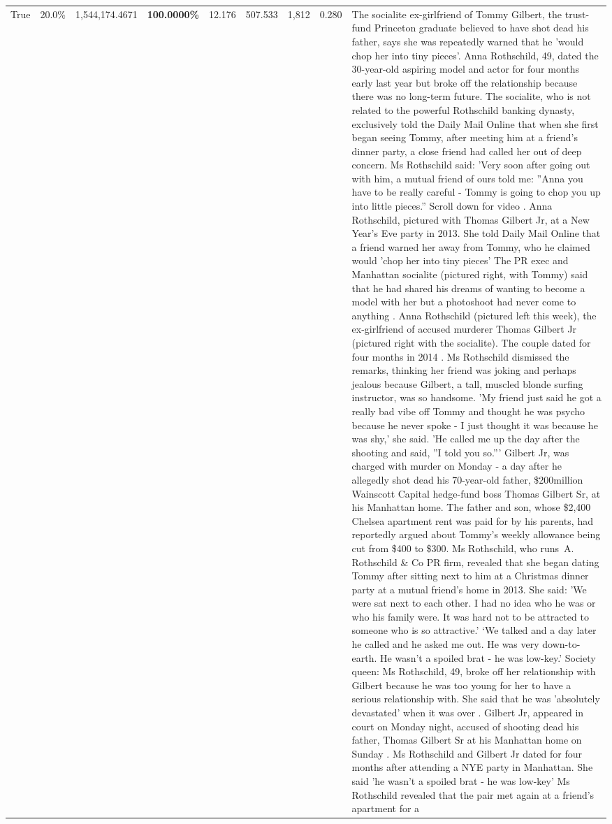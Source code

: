 \begin{table}[H]
\begin{tabular}{lllrlllll}
True & 20.0\% & 1,544,174.4671 & \bfseries \color{red} 100.0000\% & 12.176 & 507.533 & 1,812 & 0.280 & The socialite ex-girlfriend of Tommy Gilbert, the trust-fund Princeton graduate believed to have shot dead his father, says she was repeatedly warned that he 'would chop her into tiny pieces'. Anna Rothschild, 49, dated the 30-year-old aspiring model and actor for four months early last year but broke off the relationship because there was no long-term future. The socialite, who is not related to the powerful Rothschild banking dynasty, exclusively told the Daily Mail Online that when she first began seeing Tommy, after meeting him at a friend's dinner party, a close friend had called her out of deep concern. Ms Rothschild said: 'Very soon after going out with him, a mutual friend of ours told me: ''Anna you have to be really careful - Tommy is going to chop you up into little pieces.'' Scroll down for video . Anna Rothschild, pictured with Thomas Gilbert Jr, at a New Year's Eve party in 2013. She told Daily Mail Online that a friend warned her away from Tommy, who he claimed would 'chop her into tiny pieces' The PR exec and Manhattan socialite (pictured right, with Tommy) said that he had shared his dreams of wanting to become a model with her but a photoshoot had never come to anything . Anna Rothschild (pictured left this week), the ex-girlfriend of accused murderer Thomas Gilbert Jr (pictured right with the socialite). The couple dated for four months in 2014 . Ms Rothschild dismissed the remarks, thinking her friend was joking and perhaps jealous because Gilbert, a tall, muscled blonde surfing instructor, was so handsome. 'My friend just said he got a really bad vibe off Tommy and thought he was psycho because he never spoke - I just thought it was because he was shy,' she said. 'He called me up the day after the shooting and said, ''I told you so.''' Gilbert Jr, was charged with murder on Monday - a day after he allegedly shot dead his 70-year-old father, \$200million Wainscott Capital hedge-fund boss Thomas Gilbert Sr, at his Manhattan home. The father and son, whose \$2,400 Chelsea apartment rent was paid for by his parents, had reportedly argued about Tommy's weekly allowance being cut from \$400 to \$300. Ms Rothschild, who runs A. Rothschild \& Co PR firm, revealed that she began dating Tommy after sitting next to him at a Christmas dinner party at a mutual friend's home in 2013. She said: 'We were sat next to each other. I had no idea who he was or who his family were. It was hard not to be attracted to someone who is so attractive.' ‘We talked and a day later he called and he asked me out. He was very down-to-earth. He wasn’t a spoiled brat - he was low-key.’ Society queen: Ms Rothschild, 49, broke off her relationship with Gilbert because he was too young for her to have a serious relationship with. She said that he was 'absolutely devastated' when it was over . Gilbert Jr, appeared in court on Monday night, accused of shooting dead his father, Thomas Gilbert Sr at his Manhattan home on Sunday . Ms Rothschild and Gilbert Jr dated for four months after attending a NYE party in Manhattan. She said 'he wasn't a spoiled brat - he was low-key' Ms Rothschild revealed that the pair met again at a friend’s apartment for a 
\end{tabular}
\end{table}
